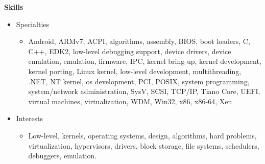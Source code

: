\documentclass[10pt]{article}
\newenvironment{sitemize}{
\begin{itemize}
  \setlength{\itemsep}{0pt}
  \setlength{\parskip}{0pt}
  \setlength{\parsep}{0pt}}{\end{itemize}
}
\begin{document}
{\large \textbf{Skills}}
\begin{sitemize}
\item Specialties
\begin{sitemize}
\item Android, ARMv7, ACPI, algorithms, assembly, BIOS, boot loaders, C, C++, EDK2, low-level debugging support, device drivers, device emulation, emulation, firmware, IPC, kernel bring-up, kernel development, kernel porting, Linux kernel, low-level development, multithreading, .NET, NT kernel, os development, PCI, POSIX, system programming, system/network administration, SysV, SCSI, TCP/IP, Tiano Core, UEFI, virtual machines, virtualization, WDM, Win32, x86, x86-64, Xen
\end{sitemize}
\item Interests
\begin{sitemize}
\item Low-level, kernels, operating systems, design, algorithms, hard problems, virtualization, hypervisors, drivers, block storage, file systems, schedulers, debuggers, emulation.
\end{sitemize}
\end{sitemize}
\end{document}
